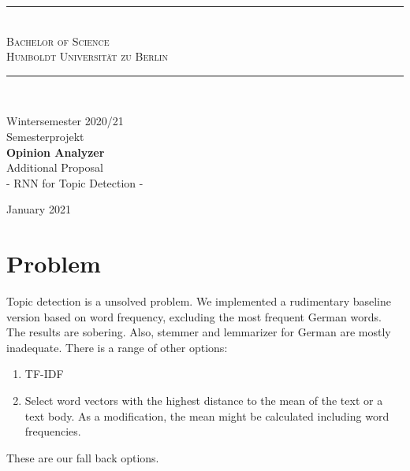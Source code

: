 \documentclass[a4paper,10pt]{article}
\begin{document}
\begin{titlepage}
\begin{center}

\rule{\textwidth}{0.5px}\\[0.5cm]
\textsc{\LARGE Bachelor of Science}\\[0.5cm]
\textsc{\Large Humboldt Universit\"at zu Berlin}\\[0.5cm]
\rule{\textwidth}{0.5px}\\[1.5cm]

\begin{figure}[h]
\begin{center}
\end{center}
\end{figure} 

{ \large Wintersemester 2020/21} \\[0.5cm] 
{ \large Semesterprojekt} \\[0.5cm]
{ \huge \bfseries  Opinion Analyzer}\\[2cm]

\huge {Additional Proposal}\\[0.5cm]
\large {- RNN for Topic Detection -}\\[1.5cm]

\vfill

{\large {January 2021}}

\end{center}
\end{titlepage}


\newpage

\section{Problem}
Topic detection is a unsolved problem. We implemented a rudimentary baseline version based on word frequency, excluding the most frequent German words. The results are sobering. Also, stemmer and lemmarizer for German are mostly inadequate. There is a range of other options:
\begin{enumerate}
\item TF-IDF
\item Select word vectors with the highest distance to the mean of the text or a text body. As a modification, the mean might be calculated including word frequencies.
\end{enumerate}
These are our fall back options.
\end{document}
